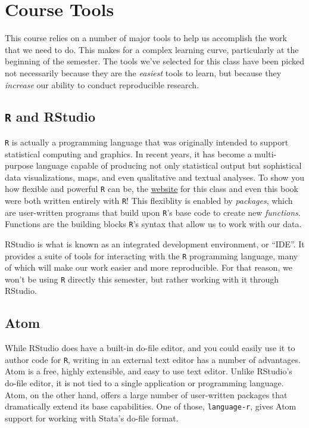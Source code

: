 \documentclass[]{book}
\theoremstyle{definition}
\theoremstyle{definition}
\theoremstyle{definition}
\theoremstyle{remark}
\begin{document}
\section{Course Tools}\label{course-tools}

This course relies on a number of major tools to help us accomplish the
work that we need to do. This makes for a complex learning curve,
particularly at the beginning of the semester. The tools we've selected
for this class have been picked not necessarily because they are the
\emph{easiest} tools to learn, but because they \emph{increase} our
ability to conduct reproducible research.

\subsection{\texorpdfstring{\texttt{R} and
RStudio}{R and RStudio}}\label{r-and-rstudio}

\texttt{R} is actually a programming language that was originally
intended to support statistical computing and graphics. In recent years,
it has become a multi-purpose language capable of producing not only
statistical output but sophistical data visualizations, maps, and even
qualitative and textual analyses. To show you how flexible and powerful
\texttt{R} can be, the \href{https://slu-soc5050.github.io}{website} for
this class and even this book were both written entirely with
\texttt{R}! This flexiblity is enabled by \emph{packages}, which are
user-written programs that build upon \texttt{R}'s base code to create
new \emph{functions}. Functions are the building blocks \texttt{R}'s
syntax that allow us to work with our data.

RStudio is what is known as an integrated development environment, or
``IDE''. It provides a suite of tools for interacting with the
\texttt{R} programming language, many of which will make our work easier
and more reproducible. For that reason, we won't be using \texttt{R}
directly this semester, but rather working with it through RStudio.

\subsection{Atom}\label{atom}

While RStudio does have a built-in do-file editor, and you could easily
use it to author code for \texttt{R}, writing in an external text editor
has a number of advantages. Atom is a free, highly extensible, and easy
to use text editor. Unlike RStudio's do-file editor, it is not tied to a
single application or programming language. Atom, on the other hand,
offers a large number of user-written packages that dramatically extend
its base capabilities. One of those, \texttt{language-r}, gives Atom
support for working with Stata's do-file format.
\end{document}
